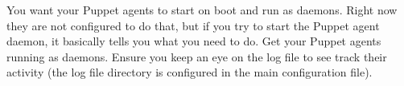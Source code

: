 \documentclass{article}   	%
\begin{document}
You want your Puppet agents to start on boot and run as daemons.  Right now they are not configured to do that, but if you try to start the Puppet agent daemon, it basically tells you what you need to do.  Get your Puppet agents running as daemons. Ensure you keep an eye on the log file to see track their activity (the log file directory is configured in the main configuration file).

\end{document}
